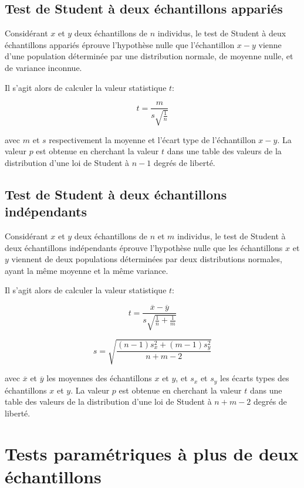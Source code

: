 \subsection*{Test de Student à deux échantillons appariés}

Considérant $x$ et $y$ deux échantillons de $n$ individus, le test de Student à deux échantillons appariés éprouve l'hypothèse nulle que l'échantillon $x-y$ vienne d'une population déterminée par une distribution normale, de moyenne nulle, et de variance inconnue.

Il s'agit alors de calculer la valeur statistique $t$:

\begin{equation}
t=\dfrac{m}{s\sqrt{\frac{1}{n}}}
\end{equation}

avec $m$ et $s$ respectivement la moyenne et l'écart type de l'échantillon $x-y$. La valeur $p$ est obtenue en cherchant la valeur $t$ dans une table des valeurs de la distribution d'une loi de Student à $n-1$ degrés de liberté.

\subsection*{Test de Student à deux échantillons indépendants}

Considérant $x$ et $y$ deux échantillons de $n$ et $m$ individus, le test de Student à deux échantillons indépendants éprouve l'hypothèse nulle que les échantillons $x$ et $y$ viennent de deux populations déterminées par deux distributions normales, ayant la même moyenne et la même variance.

Il s'agit alors de calculer la valeur statistique $t$:

\begin{equation}
t=\dfrac{\overline{x}-\overline{y}}{s\sqrt{\frac{1}{n}+\frac{1}{m}}}
\end{equation}

\begin{equation}
s=\sqrt{\dfrac{(n-1)s^2_x + (m-1)s^2_y}{n+m-2}}
\end{equation}

avec $\overline{x}$ et $\overline{y}$ les moyennes des échantillons $x$ et $y$, et $s_x$ et $s_y$ les écarts types des échantillons $x$ et $y$. La valeur $p$ est obtenue en cherchant la valeur $t$ dans une table des valeurs de la distribution d'une loi de Student à $n+m-2$ degrés de liberté.

\section{Tests paramétriques à plus de deux échantillons}
\label{app:anova}

